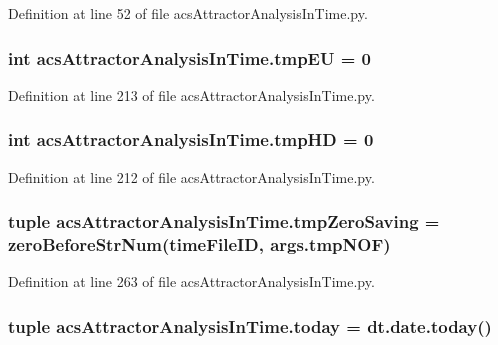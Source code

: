 Definition at line 52 of file acs\-Attractor\-Analysis\-In\-Time.\-py.

\hypertarget{a00123_a9019a56cfd992899ffc519204307a8ae}{
\subsubsection[{tmp\-E\-U}]{\setlength{\rightskip}{0pt plus 5cm}int acs\-Attractor\-Analysis\-In\-Time.\-tmp\-E\-U = 0}}\label{a00123_a9019a56cfd992899ffc519204307a8ae}


Definition at line 213 of file acs\-Attractor\-Analysis\-In\-Time.\-py.

\hypertarget{a00123_a35b7af9eb7cd962d33c5d56eae794c7b}{
\subsubsection[{tmp\-H\-D}]{\setlength{\rightskip}{0pt plus 5cm}int acs\-Attractor\-Analysis\-In\-Time.\-tmp\-H\-D = 0}}\label{a00123_a35b7af9eb7cd962d33c5d56eae794c7b}


Definition at line 212 of file acs\-Attractor\-Analysis\-In\-Time.\-py.

\hypertarget{a00123_ae86fc9dc3283934244ec28446445f722}{
\subsubsection[{tmp\-Zero\-Saving}]{\setlength{\rightskip}{0pt plus 5cm}tuple acs\-Attractor\-Analysis\-In\-Time.\-tmp\-Zero\-Saving = {\bf zero\-Before\-Str\-Num}(time\-File\-I\-D, args.\-tmp\-N\-O\-F)}}\label{a00123_ae86fc9dc3283934244ec28446445f722}


Definition at line 263 of file acs\-Attractor\-Analysis\-In\-Time.\-py.

\hypertarget{a00123_af30cd903eabfe4c9167f2a5d0062a4ce}{
\subsubsection[{today}]{\setlength{\rightskip}{0pt plus 5cm}tuple acs\-Attractor\-Analysis\-In\-Time.\-today = dt.\-date.\-today()}}\label{a00123_af30cd903eabfe4c9167f2a5d0062a4ce}


